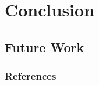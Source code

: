 \documentclass[9pt]{beamer}
\begin{document}
\section{Conclusion}
\subsection{Future Work}

%
\begin{frame}[allowframebreaks]
  \frametitle{References}
  
  {\footnotesize  }

\end{frame}

%

\end{document}
